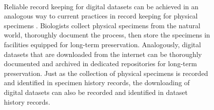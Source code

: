 \begin{figure}[ht] %


\centering
{} \\
%

\caption{Reliable record keeping for digital datasets  can be achieved in an analogous way to current practices in record keeping for physical specimens . Biologists collect physical specimens from the natural world, thoroughly document the process, then store the specimens in facilities equipped for long-term preservation. Analogously, digital datasets that are downloaded from the internet can be thoroughly documented and archived in dedicated repositories for long-term preservation. Just as the collection of physical specimens is recorded and identified in specimen history records, the downloading of digital datasets can also be recorded and identified in dataset history records.}%

\label{fig:collection} %

\end{figure}

